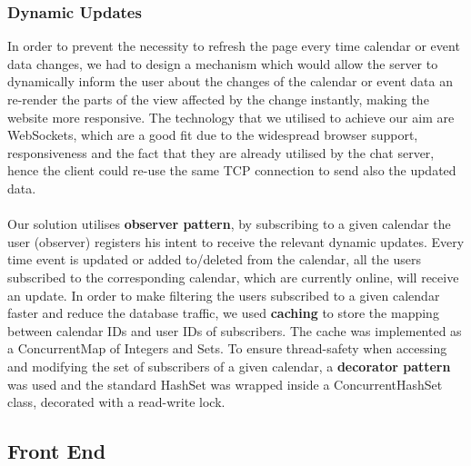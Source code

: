 \documentclass[10pt,a4paper]{article}
\begin{document}
\subsubsection{Dynamic Updates}
In order to prevent the necessity to refresh the page every time calendar or 
event data changes, we had to design a mechanism which would allow the server to 
dynamically inform the user about the 
changes of the calendar or event data an re-render the parts of the view 
affected by the change instantly, making the website more responsive. The 
technology that we utilised to 
achieve our aim are WebSockets, which are a good fit due to the widespread 
browser support, responsiveness and the fact that they are 
already utilised by the chat server, hence
the client could re-use the same TCP connection to send also the updated data.
\\
\\
\noindent Our solution utilises \textbf{observer pattern}, by subscribing to a given 
calendar the user (observer) registers his intent to receive the relevant 
dynamic updates. Every time event is updated 
or added to/deleted from the calendar, all the users subscribed to the 
corresponding calendar, which are currently online, will receive an update. In 
order to make filtering the users
subscribed to a given calendar faster and reduce the database traffic, we used 
\textbf{caching} to store the mapping between calendar IDs and user IDs of 
subscribers. The cache was implemented
as a ConcurrentMap of Integers and Sets. To ensure thread-safety when accessing 
and modifying the set of subscribers of a given calendar, a \textbf{decorator 
pattern} was used and the standard
HashSet was wrapped inside a ConcurrentHashSet class, decorated with a 
read-write lock.

\subsection{Front End}
\end{document}

